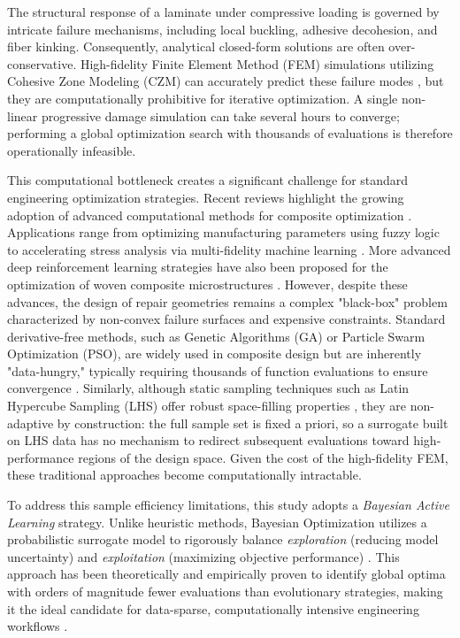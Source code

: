 \documentclass[
  preprint,
  12pt,
  a4paper
]{elsarticle}
\newcommand{\new}[1]{#1}
\begin{document}
The structural response of a laminate under compressive loading is governed by intricate failure mechanisms, including local buckling, adhesive decohesion, and fiber kinking. Consequently, analytical closed-form solutions are often over-conservative. High-fidelity Finite Element Method (FEM) simulations utilizing Cohesive Zone Modeling (CZM) can accurately predict these failure modes \cite{turon2007engineering, alfano2001finite}, but they are computationally prohibitive for iterative optimization. A single non-linear progressive damage simulation can take several hours to converge; performing a global optimization search with thousands of evaluations is therefore operationally infeasible.

This computational bottleneck creates a significant challenge for standard engineering optimization strategies. Recent reviews highlight the growing adoption of \new{advanced computational methods} for composite optimization \cite{chen2023intelligent}. Applications range from optimizing manufacturing parameters using fuzzy logic \cite{babu2021artificial} to accelerating stress analysis via multi-fidelity machine learning \cite{azeem2024machine}. More advanced deep reinforcement learning strategies have also been proposed for \new{the optimization of woven composite microstructures} \cite{hsu2025ai}. However, despite these advances, the design of repair geometries remains a complex "black-box" problem characterized by non-convex failure surfaces and expensive constraints. Standard derivative-free methods, such as Genetic Algorithms (GA) or Particle Swarm Optimization (PSO), are widely used in composite design but are inherently "data-hungry," typically requiring thousands of function evaluations to ensure convergence \cite{deb2002fast, queipo2005surrogate}. \new{Similarly, although static sampling techniques such as Latin Hypercube Sampling (LHS) offer robust space-filling properties \cite{mckay1979comparison}, they are non-adaptive by construction: the full sample set is fixed a priori, so a surrogate built on LHS data has no mechanism to redirect subsequent evaluations toward high-performance regions of the design space.} Given the cost of the high-fidelity FEM, these traditional approaches become computationally intractable.

To address this sample efficiency limitations, this study adopts a \textit{Bayesian Active Learning} strategy. Unlike heuristic methods, Bayesian Optimization utilizes a probabilistic surrogate model to rigorously balance \textit{exploration} (reducing model uncertainty) and \textit{exploitation} (maximizing objective performance) \cite{shahriari2015taking}. This approach has been theoretically and empirically proven to identify global optima with orders of magnitude fewer evaluations than evolutionary strategies, making it the ideal candidate for data-sparse, computationally intensive engineering workflows \cite{jones1998efficient, ghosh2023digital}.
\end{document}
